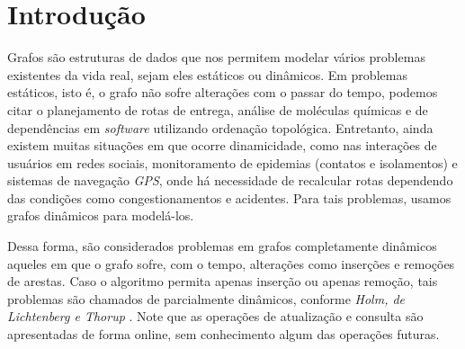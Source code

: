 

\chapter{Introdução}
\label{cap:introducao}

\enlargethispage{.5\baselineskip}

Grafos são estruturas de dados que nos permitem modelar vários problemas existentes da vida real, sejam eles estáticos ou dinâmicos. Em problemas estáticos, isto é, o grafo não sofre alterações com o passar do tempo, podemos citar o planejamento de rotas de entrega, análise de moléculas químicas e de dependências em \textit{software} utilizando ordenação topológica. Entretanto, ainda existem muitas situações em que ocorre dinamicidade, como nas interações de usuários em redes sociais, monitoramento de epidemias (contatos e isolamentos) e sistemas de navegação \textit{GPS}, onde há necessidade de recalcular rotas dependendo das condições como congestionamentos e acidentes. Para tais problemas, usamos grafos dinâmicos para modelá-los.

Dessa forma, são considerados problemas em grafos completamente dinâmicos aqueles em que o grafo sofre, com o tempo, alterações como inserções e remoções 
de arestas. Caso o algoritmo permita apenas inserção ou apenas remoção, tais 
problemas são chamados de parcialmente dinâmicos, conforme \textit{Holm, de Lichtenberg e Thorup} \cite{jacob_holm}. Note que as operações de 
atualização e consulta são apresentadas de forma online, sem conhecimento algum das operações futuras.


